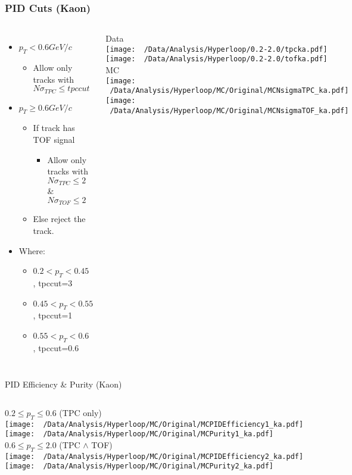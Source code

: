 \documentclass{beamer}
\begin{document}
\begin{frame}
	\frametitle{PID Cuts (Kaon)}
	\begin{columns}
		\begin{itemize}
			\item $p_T<0.6GeV/c$
			\begin{itemize}
				\item Allow only tracks with $N\sigma_{TPC} \leq tpccut$
			\end{itemize}
			\item $p_T\geq 0.6GeV/c$
			\begin{itemize}
				\item If track has TOF signal
				\begin{itemize}
					\item Allow  only tracks with $N\sigma_{TPC} \leq 2$ \& $N\sigma_{TOF}\leq 2$
				\end{itemize}
				\item Else reject the track.
			\end{itemize}
			\item Where:
			\begin{itemize}
				\item $0.2<p_T<0.45$ , tpccut=3
				\item $0.45<p_T<0.55$ , tpccut=1
				\item $0.55<p_T<0.6$ , tpccut=0.6
			\end{itemize}
		\end{itemize}
		\centering
		{\tiny Data}\\
		\texttt{[image: ~/Data/Analysis/Hyperloop/0.2-2.0/tpcka.pdf]}\\
		\texttt{[image: ~/Data/Analysis/Hyperloop/0.2-2.0/tofka.pdf]}\\
		{\tiny MC}\\
		\texttt{[image: ~/Data/Analysis/Hyperloop/MC/Original/MCNsigmaTPC\_ka.pdf]}\\
		\texttt{[image: ~/Data/Analysis/Hyperloop/MC/Original/MCNsigmaTOF\_ka.pdf]}\\
	\end{columns}
\end{frame}
\begin{frame}{PID Efficiency \& Purity (Kaon)}
	\begin{columns}
		\centering
		$0.2\leq p_T \leq 0.6$ (TPC only)\\
		\texttt{[image: ~/Data/Analysis/Hyperloop/MC/Original/MCPIDEfficiency1\_ka.pdf]}\\
		\texttt{[image: ~/Data/Analysis/Hyperloop/MC/Original/MCPurity1\_ka.pdf]}
		\centering
		$0.6\leq p_T \leq 2.0$ (TPC $\land$ TOF)\\
		\texttt{[image: ~/Data/Analysis/Hyperloop/MC/Original/MCPIDEfficiency2\_ka.pdf]}\\
		\texttt{[image: ~/Data/Analysis/Hyperloop/MC/Original/MCPurity2\_ka.pdf]}
	\end{columns}
\end{frame}
\end{document}
